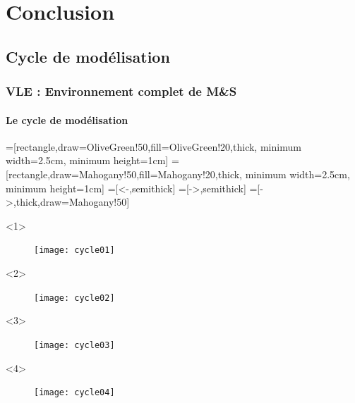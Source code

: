 \documentclass[xetex, compress, table, dvipsnames]{beamer}
\begin{document}
\section{Conclusion}

\subsection{Cycle de modélisation}

\begin{frame}
  \frametitle{VLE : Environnement complet de M\&S}
  \framesubtitle{Le cycle de modélisation}
  \begin{center}
    =[rectangle,draw=OliveGreen!50,fill=OliveGreen!20,thick,
    minimum width=2.5cm, minimum height=1cm]
    =[rectangle,draw=Mahogany!50,fill=Mahogany!20,thick,
    minimum width=2.5cm, minimum height=1cm]
    =[<-,semithick]
    =[->,semithick]
    =[->,thick,draw=Mahogany!50]
    \begin{onlyenv}<1>
      \begin{figure}[htpb]
        \begin{center}
          \texttt{[image: cycle01]}
        \end{center}
      \end{figure}
    \end{onlyenv}
    \begin{onlyenv}<2>
      \begin{figure}[htpb]
        \begin{center}
          \texttt{[image: cycle02]}
        \end{center}
      \end{figure}
    \end{onlyenv}
    \begin{onlyenv}<3>
      \begin{figure}[htpb]
        \begin{center}
          \texttt{[image: cycle03]}
        \end{center}
      \end{figure}
    \end{onlyenv}
    \begin{onlyenv}<4>
      \begin{figure}[htpb]
        \begin{center}
          \texttt{[image: cycle04]}
        \end{center}
      \end{figure}
    \end{onlyenv}

\end{center}
\end{frame}
\end{document}
